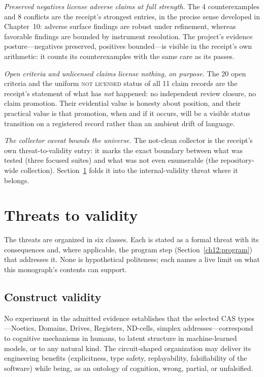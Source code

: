 \emph{Preserved negatives license adverse claims at full strength.} The 4 counterexamples and 8 conflicts are the receipt's strongest entries, in the precise sense developed in Chapter~10: adverse surface findings are robust under refinement, whereas favorable findings are bounded by instrument resolution. The project's evidence posture---negatives preserved, positives bounded---is visible in the receipt's own arithmetic: it counts its counterexamples with the same care as its passes.

\emph{Open criteria and unlicensed claims license nothing, on purpose.} The 20 open criteria and the uniform \textsc{not licensed} status of all 11 claim records are the receipt's statement of what has \emph{not} happened: no independent review closure, no claim promotion. Their evidential value is honesty about position, and their practical value is that promotion, when and if it occurs, will be a visible status transition on a registered record rather than an ambient drift of language.

\emph{The collector caveat bounds the universe.} The not-clean collector is the receipt's own threat-to-validity entry: it marks the exact boundary between what was tested (three focused suites) and what was not even enumerable (the repository-wide collection). Section~\ref{ch12:threats} folds it into the internal-validity threat where it belongs.

\section{Threats to validity}\label{ch12:threats}

The threats are organized in six classes. Each is stated as a formal threat with its consequences and, where applicable, the program step (Section~\ref{ch12:program}) that addresses it. None is hypothetical politeness; each names a live limit on what this monograph's contents can support.

\subsection{Construct validity}\label{ch12:threats-construct}

\begin{threat}\label{ch12:threat-construct}
No experiment in the admitted evidence establishes that the selected CAS types---Noetics, Domains, Drives, Registers, ND-cells, simplex addresses---correspond to cognitive mechanisms in humans, to latent structure in machine-learned models, or to any natural kind. The circuit-shaped organization may deliver its engineering benefits (explicitness, type safety, replayability, falsifiability of the software) while being, as an ontology of cognition, wrong, partial, or unfalsified.
\end{threat}

